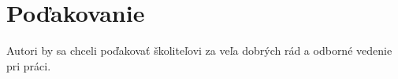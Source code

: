 \section*{Poďakovanie}
Autori by sa chceli poďakovať školiteľovi za veľa dobrých rád 
a odborné vedenie pri práci.